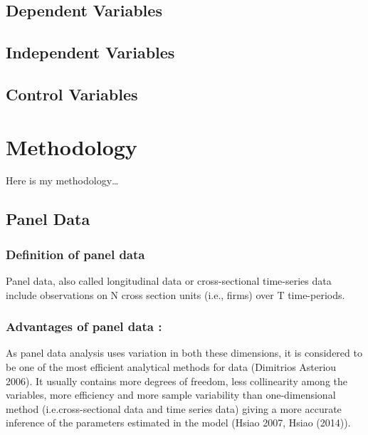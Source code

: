 \documentclass[12pt,]{article}
\begin{document}
\subsection{Dependent Variables}\label{dependent-variables}

\subsection{Independent Variables}\label{independent-variables}

\subsection{Control Variables}\label{control-variables}

\FloatBarrier
\newpage
{}

\section{Methodology}\label{methodology}

Here is my methodology\ldots{}

\subsection{Panel Data}\label{panel-data}

\subsubsection{Definition of panel data}\label{definition-of-panel-data}

Panel data, also called longitudinal data or cross-sectional time-series
data include observations on N cross section units (i.e., firms) over T
time-periods.

\subsubsection{Advantages of panel data
:}\label{advantages-of-panel-data}

As panel data analysis uses variation in both these dimensions, it is
considered to be one of the most efficient analytical methods for data
(Dimitrios Asteriou 2006). It usually contains more degrees of freedom,
less collinearity among the variables, more efficiency and more sample
variability than one-dimensional method (i.e.cross-sectional data and
time series data) giving a more accurate inference of the parameters
estimated in the model (Hsiao 2007, Hsiao (2014)).
\end{document}
